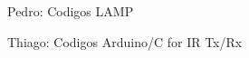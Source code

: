 \begin{section}{Pedro: Codigos LAMP}
\end{section}

\begin{section}{Thiago: Codigos Arduino/C for IR Tx/Rx}
\end{section}
